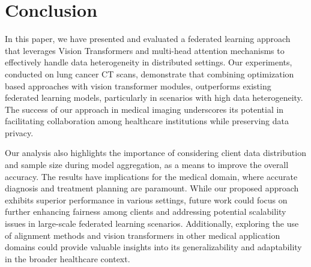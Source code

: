 \section{Conclusion}
In this paper, we have presented and evaluated a federated learning approach that leverages Vision Transformers and multi-head attention mechanisms to effectively handle data heterogeneity in distributed settings. Our  experiments, conducted on lung cancer CT scans, demonstrate that combining optimization based approaches with vision transformer modules, outperforms existing federated learning models, particularly in scenarios with high data heterogeneity. The success of our approach in medical imaging underscores its potential in facilitating collaboration among healthcare institutions while preserving data privacy.

Our analysis  also highlights the importance of considering client data distribution and sample size during model aggregation, as a means to improve the overall accuracy. The results have implications for the medical domain, where accurate diagnosis and treatment planning are paramount. While our proposed approach exhibits superior performance in various settings, future work could focus on further enhancing fairness among clients and addressing potential scalability issues in large-scale federated learning scenarios. Additionally, exploring the use of alignment methods and vision transformers in other medical application domains could provide valuable insights into its generalizability and adaptability in the broader healthcare context.


\printbibliography